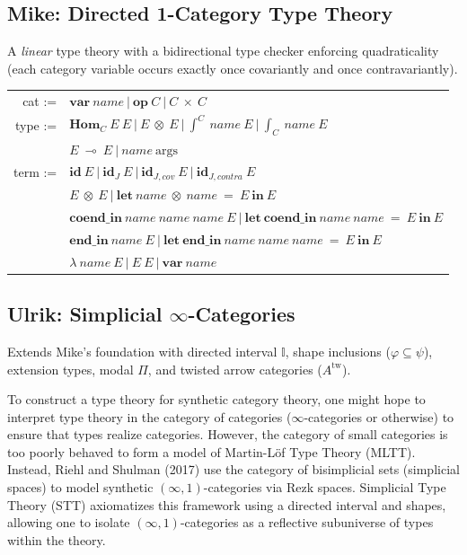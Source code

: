 \documentclass{article}
\theoremstyle{definition}
\theoremstyle{plain}
\begin{document}
\subsection{Mike: Directed 1-Category Type Theory}
A \emph{linear} type theory with a bidirectional type checker enforcing
quadraticality (each category variable occurs exactly once covariantly and
once contravariantly).
\begin{table}[ht!]
\centering
\begin{tabular}{rl}
     cat :=&$\textbf{var}\ name\ |\ \textbf{op}\ C\ |\ C\ \times\ C$ \\
    type :=&$\textbf{Hom}_C\ E\ E\ |\ E\ \otimes\ E\ |\ \int^{C}\ name\ E\ |\ \int_{C}\ name\ E$ \\
         &$E\ \multimap\ E\ |\ name\ \textrm{args}$ \\
    term :=&$\textbf{id}\ E\ |\ \textbf{id}_J\ E\ |\ \textbf{id}_{J,cov}\ E\ |\ \textbf{id}_{J,contra}\ E$ \\
         &$E\ \otimes\ E\ |\ \textbf{let}\ name\ \otimes\ name\ \mathbf{=}\ E\ \textbf{in}\ E$ \\
         &$\mathbf{coend\_in}\ name\ name\ name\ E\ |\ \textbf{let}\ \mathbf{coend\_in}\ name\ name\ \mathbf{=}\ E\ \textbf{in}\ E$ \\
         &$\mathbf{end\_in}\ name\ E\ |\ \textbf{let}\ \mathbf{end\_in}\ name\ name\ name\ \mathbf{=}\ E\ \textbf{in}\ E$ \\
         &$\lambda\ name\ E\ |\ E\ E\ |\ \textbf{var}\ name$ \\
\end{tabular}
\end{table}

\newpage
\subsection{Ulrik: Simplicial \texorpdfstring{$\infty$}{Infinity}-Categories}
Extends Mike's foundation with directed interval $\mathbb{I}$, shape
inclusions ($\varphi \subseteq \psi$), extension types, modal $\Pi$, and
twisted arrow categories ($A^{\mathrm{tw}}$).

To construct a type theory for synthetic category theory, one might hope to interpret type theory in the category of categories ($\infty$-categories or otherwise) to ensure that types realize categories. However, the category of small categories is too poorly behaved to form a model of Martin-Löf Type Theory (MLTT). Instead, Riehl and Shulman (2017) use the category of bisimplicial sets (simplicial spaces) to model synthetic $(\infty, 1)$-categories via Rezk spaces. Simplicial Type Theory (STT) axiomatizes this framework using a directed interval and shapes, allowing one to isolate $(\infty, 1)$-categories as a reflective subuniverse of types within the theory.
\end{document}
